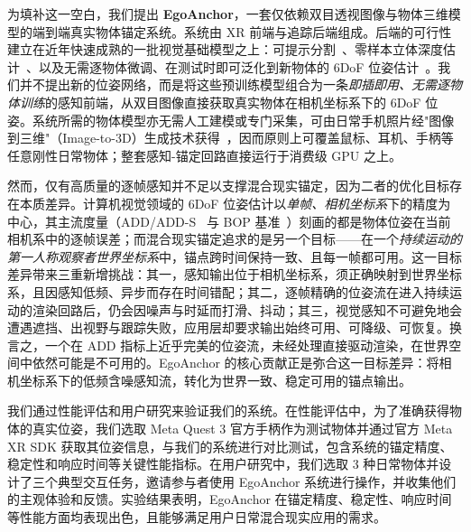 \documentclass[review]{vgtc}
\begin{document}
为填补这一空白，我们提出 \textbf{EgoAnchor}，一套仅依赖双目透视图像与物体三维模型的端到端真实物体锚定系统。系统由 XR 前端与追踪后端组成。后端的可行性建立在近年快速成熟的一批视觉基础模型之上：可提示分割~\cite{kirillov2023sam,sam3_2025,yoloe2025}、零样本立体深度估计~\cite{foundationstereo2025}、以及无需逐物体微调、在测试时即可泛化到新物体的 6DoF 位姿估计~\cite{foundationpose2023,bundlesdf2023}。我们并不提出新的位姿网络，而是将这些预训练模型组合为一条\emph{即插即用、无需逐物体训练}的感知前端，从双目图像直接获取真实物体在相机坐标系下的 6DoF 位姿。系统所需的物体模型亦无需人工建模或专门采集，可由日常手机照片经"图像到三维"（Image-to-3D）生成技术获得~\cite{trellis2024,appleObjectCapture}，因而原则上可覆盖鼠标、耳机、手柄等任意刚性日常物体；整套感知-锚定回路直接运行于消费级 GPU 之上。

然而，仅有高质量的逐帧感知并不足以支撑混合现实锚定，因为二者的优化目标存在本质差异。计算机视觉领域的 6DoF 位姿估计以\emph{单帧、相机坐标系}下的精度为中心，其主流度量（ADD/ADD-S~\cite{hinterstoisser2012add,posecnn2017} 与 BOP 基准~\cite{hodan2020bop}）刻画的都是物体位姿在当前相机系中的逐帧误差；而混合现实锚定追求的是另一个目标——在一个\emph{持续运动的第一人称观察者世界坐标系}中，锚点跨时间保持一致、且每一帧都可用。这一目标差异带来三重新增挑战：其一，感知输出位于相机坐标系，须正确映射到世界坐标系，且因感知低频、异步而存在时间错配；其二，逐帧精确的位姿流在进入持续运动的渲染回路后，仍会因噪声与时延而打滑、抖动；其三，视觉感知不可避免地会遭遇遮挡、出视野与跟踪失败，应用层却要求输出始终可用、可降级、可恢复。换言之，一个在 ADD 指标上近乎完美的位姿流，未经处理直接驱动渲染，在世界空间中依然可能是不可用的。EgoAnchor 的核心贡献正是弥合这一目标差异：将相机坐标系下的低频含噪感知流，转化为世界一致、稳定可用的锚点输出。

我们通过性能评估和用户研究来验证我们的系统。在性能评估中，为了准确获得物体的真实位姿，我们选取 Meta Quest 3 官方手柄作为测试物体并通过官方 Meta XR SDK 获取其位姿信息，与我们的系统进行对比测试，包含系统的锚定精度、稳定性和响应时间等关键性能指标。在用户研究中，我们选取 3 种日常物体并设计了三个典型交互任务，邀请参与者使用 EgoAnchor 系统进行操作，并收集他们的主观体验和反馈。实验结果表明，EgoAnchor 在锚定精度、稳定性、响应时间等性能方面均表现出色，且能够满足用户日常混合现实应用的需求。
\end{document}
